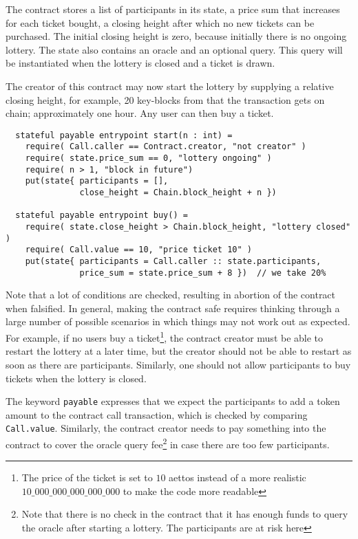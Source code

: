 The contract stores a list of participants in its state, a price sum
that increases for each ticket bought, a closing height after which no
new tickets can be purchased. The initial closing height is zero,
because initially there is no ongoing lottery. The state also contains
an oracle and an optional query. This query will be instantiated when
the lottery is closed and a ticket is drawn.

The creator of this contract may now start the lottery by supplying a relative
closing height,
for example, 20 key-blocks from that the transaction gets on chain;
approximately one hour. Any user can then buy a ticket.
\begin{verbatim}
  stateful payable entrypoint start(n : int) =
    require( Call.caller == Contract.creator, "not creator" )
    require( state.price_sum == 0, "lottery ongoing" )
    require( n > 1, "block in future")
    put(state{ participants = [],
               close_height = Chain.block_height + n })

  stateful payable entrypoint buy() =
    require( state.close_height > Chain.block_height, "lottery closed" )
    require( Call.value == 10, "price ticket 10" )
    put(state{ participants = Call.caller :: state.participants,
               price_sum = state.price_sum + 8 })  // we take 20%
\end{verbatim}
Note that a lot of conditions are checked, resulting in abortion of
the contract when falsified. In general, making the contract safe
requires thinking through a large number of possible scenarios in
which things may not work out as expected.
For example, if no users buy a ticket\footnote{The price of the ticket
is set to $10$ aettos instead of a more realistic
$10\_000\_000\_000\_000\_000$ to
make the code more readable}, the contract creator must be
able to restart the lottery at a later time, but the creator should
not be able to restart as soon as there are participants. Similarly,
one should not allow participants to buy tickets when the lottery is
closed.

The keyword \verb+payable+ expresses that we expect the participants
to add a token amount to the contract call transaction, which is
checked by comparing \verb+Call.value+. Similarly, the contract
creator needs to pay something into the contract to cover the oracle query
fee\footnote{Note that there is no check in the contract that it has
  enough funds to query the oracle after starting a lottery. The
  participants are at risk here} in case there are too few
participants.

